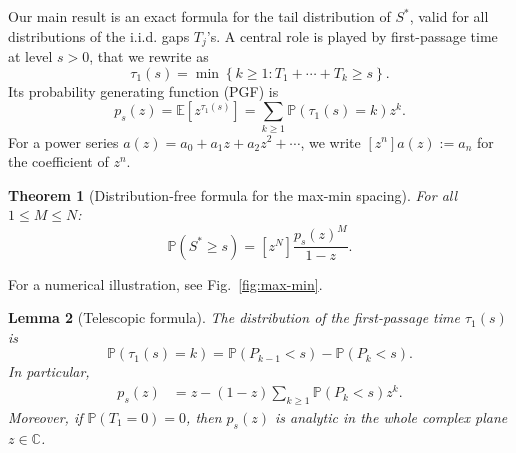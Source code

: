 \documentclass[a4paper,reqno,11pt]{amsart}
\numberwithin{equation}{section}
\def\C{{\mathbb C}}
\def\PR{\mathbb{P}}
\def\EE{{\mathbb E}}
\def\PP{{\mathbb P}}
\newtheorem{thm}{Theorem}
\numberwithin{thm}{section}
\theoremstyle{plain}
\newtheorem{lem}[thm]{Lemma}
\theoremstyle{definition}
\begin{document}
{Our main result is an exact formula for the tail distribution of $S^*$, valid for all distributions of the i.i.d. gaps $T_j$'s.
 A central role is played by first-passage time at level $s>0$, that we rewrite as  
\begin{equation}
    \tau_1(s)=\min\left\{k\geq 1\colon T_{1}+\cdots+T_{k}\geq s\right\}.
\end{equation}
Its probability generating function (PGF) is
\begin{equation}\label{eq:pgf_tau^s}
  p_{s}(z) = \EE[ z^{\tau_1(s)} ] = \sum_{k\geq 1} \PP\left(\tau_1(s)=k\right)z^k.
\end{equation} 
For a power series $a(z)=a_0+a_1z+a_2z^2+\cdots$, we write $[z^n]a(z):=a_n$  for the coefficient of $z^n$.



\begin{thm}[Distribution-free formula for the max-min spacing]
\label{thm:main}
For all $1\leq M\leq N$:
\begin{equation}\label{eq:main}
\PR(S^* \geq s)
   = [z^N]\frac{p_s(z)^M}{1-z}.
\end{equation}

\end{thm}
For a numerical illustration, see Fig.~\ref{fig:max-min}.

\begin{lem}[Telescopic formula] 
\label{lem:telescopic} The distribution of the first-passage time $\tau_1(s)$ is 
\begin{equation}
  \PR(\tau_1(s)=k)= \PR(P_{k-1}< s)-\PR(P_{k}< s).
  \label{eq:PL}
\end{equation}
In particular,
\begin{equation}
\begin{aligned}
       p_s(z)
        &=z-(1-z)\sum_{k\geq1}\PR(P_{k}< s)z^{k}.
    \label{eq:pgf-telescopic} 
\end{aligned}
\end{equation}
 Moreover, if $\PP(T_1=0)=0$, then $p_s(z)$ is analytic in the whole complex plane $z\in\C$.
\end{lem}

}
\end{document}
